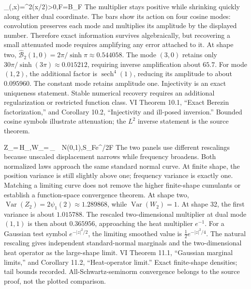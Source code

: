 {_\alpha(\xi,x)=^{2\alpha}(x/2)>0,\qquad \widetilde F=\mathcal B_\alpha*F}
{The multiplier stays positive while shrinking quickly along either dual coordinate. The bars show its action on four cosine modes: convolution preserves each mode and multiplies its amplitude by the displayed number. Therefore exact information survives algebraically, but recovering a small attenuated mode requires amplifying any error attached to it.}
{At shape two, $\widehat{\mathcal B}_2(1,0)=2\pi/\sinh\pi\approx0.544058$. The mode $(3,0)$ retains only $30\pi/\sinh(3\pi)\approx0.015212$, requiring inverse amplification about $65.7$. For mode $(1,2)$, the additional factor is $\operatorname{sech}^4(1)$, reducing its amplitude to about $0.095960$. The constant mode retains amplitude one.}
{Injectivity is an exact uniqueness statement. Stable numerical recovery requires an additional regularization or restricted function class.}
{VI Theorem 10.1, ``Exact Berezin factorization,'' and Corollary 10.2, ``Injectivity and ill-posed inversion.'' Bounded cosine symbols illustrate attenuation; the $L^2$ inverse statement is the source theorem.}

{Z_\alpha=\,H_\alpha,\quad W_\alpha=\,\Omega_\alpha\ \Longrightarrow\ N(0,1),\qquad S_\alpha F\longrightarrow e^{\Delta/2}F}
{The two panels use different rescalings because unscaled displacement narrows while frequency broadens. Both normalized laws approach the same standard normal curve. At finite shape, the position variance is still slightly above one; frequency variance is exactly one. Matching a limiting curve does not remove the higher finite-shape cumulants or establish a function-space convergence theorem.}
{At shape two, $\operatorname{Var}(Z_2)=2\psi_1(2)\approx1.289868$, while $\operatorname{Var}(W_2)=1$. At shape 32, the first variance is about $1.015788$. The rescaled two-dimensional multiplier at dual mode $(1,1)$ is then about $0.365956$, approaching the heat multiplier $e^{-1}$. For a Gaussian test symbol $e^{-|z|^2/2}$, the limiting smoothed value is $\tfrac12e^{-|z|^2/4}$.}
{The natural rescaling gives independent standard-normal marginals and the two-dimensional heat operator as the large-shape limit.}
{VI Theorem 11.1, ``Gaussian marginal limits,'' and Corollary 11.2, ``Heat-operator limit.'' Exact finite-shape densities; tail bounds recorded. All-Schwartz-seminorm convergence belongs to the source proof, not the plotted comparison.}

